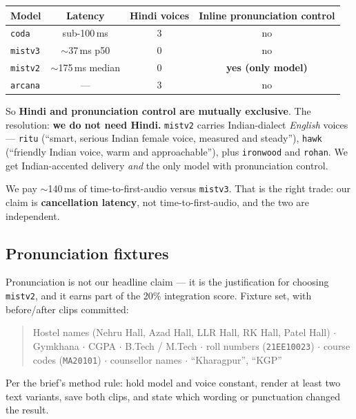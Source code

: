 \documentclass[11pt,a4paper]{article}
\newcommand{\code}[1]{\texttt{\small #1}}
\begin{document}
\begin{center}
\begin{tabular}{@{}lccc@{}}
\toprule
\textbf{Model} & \textbf{Latency} & \textbf{Hindi voices} & \textbf{Inline pronunciation control} \\
\midrule
\code{coda} & sub-100\,ms & 3 & no \\
\code{mistv3} & $\sim$37\,ms p50 & 0 & no \\
\code{mistv2} & $\sim$175\,ms median & 0 & \textbf{yes (only model)} \\
\code{arcana} & --- & 3 & no \\
\bottomrule
\end{tabular}
\end{center}

\vspace{0.3em}
So \textbf{Hindi and pronunciation control are mutually exclusive}. The resolution:
\textbf{we do not need Hindi.} \code{mistv2} carries Indian-dialect \emph{English} voices
--- \code{ritu} (``smart, serious Indian female voice, measured and steady''),
\code{hawk} (``friendly Indian voice, warm and approachable''), plus \code{ironwood}
and \code{rohan}. We get Indian-accented delivery \emph{and} the only model with
pronunciation control.

\vspace{0.3em}
We pay $\sim$140\,ms of time-to-first-audio versus \code{mistv3}. That is the right trade:
our claim is \textbf{cancellation latency}, not time-to-first-audio, and the two are
independent.

\subsection{Pronunciation fixtures}

Pronunciation is not our headline claim --- it is the justification for choosing
\code{mistv2}, and it earns part of the 20\% integration score. Fixture set, with
before/after clips committed:

\begin{quote}\small
Hostel names (Nehru Hall, Azad Hall, LLR Hall, RK Hall, Patel Hall) $\cdot$ Gymkhana
$\cdot$ CGPA $\cdot$ B.Tech / M.Tech $\cdot$ roll numbers (\code{21EE10023})
$\cdot$ course codes (\code{MA20101}) $\cdot$ counsellor names $\cdot$ ``Kharagpur'', ``KGP''
\end{quote}

Per the brief's method rule: hold model and voice constant, render at least two text
variants, save both clips, and state which wording or punctuation changed the result.
\end{document}
